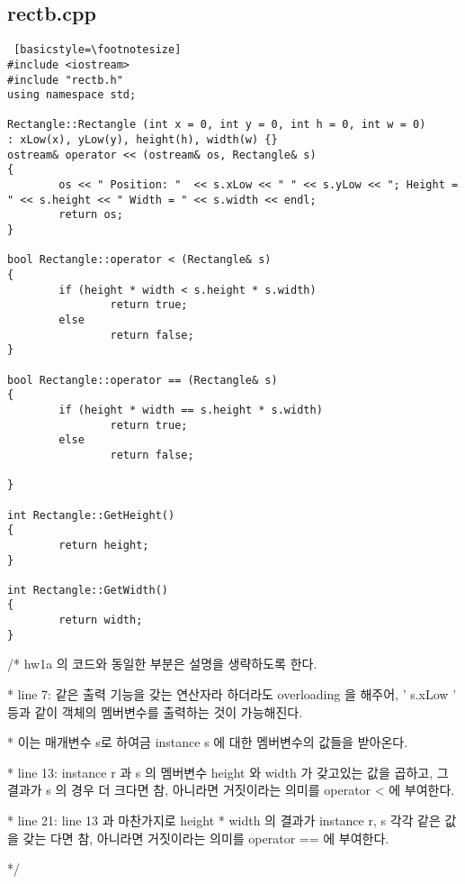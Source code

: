 \documentclass[twoside,twocolumn]{article}
\newenvironment{itemizeReduced}{
\begin{list}{\labelitemi}{\leftmargin=1em}
\setlength{\itemsep}{1pt}
\setlength{\parskip}{0pt}
\setlength{\parsep}{0pt}}{\end{list}
}
\begin{document}
\subsection{rectb.cpp}
\begin{lstlisting} [basicstyle=\footnotesize]
#include <iostream>
#include "rectb.h"
using namespace std;

Rectangle::Rectangle (int x = 0, int y = 0, int h = 0, int w = 0)
: xLow(x), yLow(y), height(h), width(w) {}
ostream& operator << (ostream& os, Rectangle& s)
{
        os << " Position: "  << s.xLow << " " << s.yLow << "; Height = " << s.height << " Width = " << s.width << endl;
        return os;
}

bool Rectangle::operator < (Rectangle& s)
{
        if (height * width < s.height * s.width)
                return true;
        else
                return false;
}

bool Rectangle::operator == (Rectangle& s)
{
        if (height * width == s.height * s.width)
                return true;
        else
                return false;

}

int Rectangle::GetHeight()
{
        return height;
}

int Rectangle::GetWidth()
{
        return width;
}
\end{lstlisting}
\begin{itemizeReduced}
    \item[/*] hw1a 의 코드와 동일한 부분은 설명을 생략하도록 한다.
    \item[*] line 7: 같은 출력 기능을 갖는 연산자라 하더라도 overloading 을 해주어, ' s.xLow ' 등과 같이 객체의 멤버변수를 출력하는 것이 가능해진다. 
    \item[*] 이는 매개변수 s로 하여금 instance s 에 대한 멤버변수의 값들을 받아온다.
    \item[*] line 13: instance r 과 s 의 멤버변수 height 와 width 가 갖고있는 값을 곱하고, 그 결과가 s 의 경우 더 크다면 참, 아니라면 거짓이라는 의미를 operator < 에 부여한다.
    \item[*] line 21: line 13 과 마찬가지로 height * width 의 결과가 instance r, s 각각 같은 값을 갖는 다면 참, 아니라면 거짓이라는 의미를 operator == 에 부여한다.
\end{itemizeReduced}
*/
\end{document}
